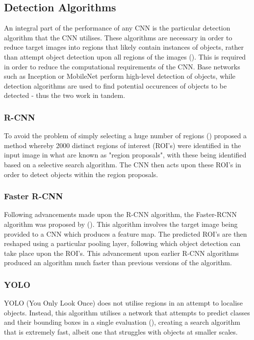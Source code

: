 \documentclass[12pt]{report}
\begin{document}
\subsection{Detection Algorithms}
\begin{flushleft}
An integral part of the performance of any CNN is the particular detection algorithm that the CNN utilises. These algorithms are necessary in order to reduce target images into regions that likely contain instances of objects, rather than attempt object detection upon all regions of the images (\cite{girshick2014rich}). This is required in order to reduce the computational requirements of the CNN. Base networks such as Inception or MobileNet perform high-level detection of objects, while detection algorithms are used to find potential occurences of objects to be detected - thus the two work in tandem. 
\end{flushleft}
\subsubsection{R-CNN}
\begin{flushleft}
To avoid the problem of simply selecting a huge number of regions (\cite{girshick2014rich}) proposed a method whereby 2000 distinct regions of interest (ROI's) were identified in the input image in what are known as "region proposals", with these being identified based on a selective search algorithm. The CNN then acts upon these ROI's in order to detect objects within the region proposals.
\end{flushleft}

\subsubsection{Faster R-CNN}
\begin{flushleft}
Following advancements made upon the R-CNN algorithm, the Faster-RCNN algorithm was proposed by (\cite{ren2015faster}). This algorithm involves the target image being provided to a CNN which produces a feature map. The predicted ROI's are then reshaped using a particular pooling layer, following which object detection can take place upon the ROI's. This advancement upon earlier R-CNN algorithms produced an algorithm much faster than previous versions of the algorithm.
\end{flushleft}

\subsubsection{YOLO}
\begin{flushleft}
YOLO (You Only Look Once) does not utilise regions in an attempt to localise objects. Instead, this algorithm utilises a network that attempts to predict classes and their bounding boxes in a single evaluation (\cite{redmon2016you}), creating a search algorithm that is extremely fast, albeit one that struggles with objects at smaller scales.
\end{flushleft}
\end{document}
